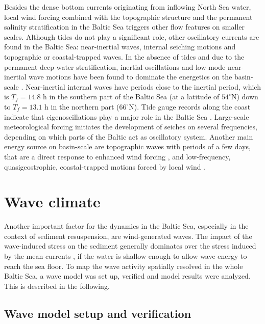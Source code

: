 Besides the dense bottom currents originating from inflowing North Sea water, 
local wind forcing combined with the topographic structure and the permanent 
salinity stratification in the Baltic Sea triggers other flow features on 
smaller scales. Although tides do not play a significant role, other 
oscillatory currents are found in the Baltic Sea: near-inertial waves, internal 
seiching motions and topographic or coastal-trapped waves.
In the absence of tides and due to the permanent deep-water stratification, 
inertial oscillations and low-mode near-inertial wave motions have been found to 
dominate the energetics on the basin-scale \citep[][]{vanderlee2011}. 
Near-inertial internal waves have periods close to the inertial period, which is 
$T_f = 14.8$ h in the southern part of the Baltic Sea (at a latitude of 
$54^{\circ}$N) down to $T_f = 13.1$ h in the northern part ($66^{\circ}$N). 
Tide gauge records along the coast indicate that eigenoscillations play a 
major role in the Baltic Sea \citep[][]{wubber1979}. Large-scale meteorological 
forcing initiates the development of seiches on several frequencies, depending 
on which parts of the Baltic act as oscillatory system. 
 Another main energy source on basin-scale are topographic waves with periods 
of a few days, that are a direct response to enhanced wind forcing 
\citep[][]{holtermann2012}, and low-frequency, quasigeostrophic, 
coastal-trapped motions forced by local wind \citep[][]{pizarro1998}.

\section{Wave climate}

Another important factor for the dynamics in the Baltic Sea, especially 
in the context of sediment resuspension, are wind-generated waves. The impact 
of the wave-induced stress on the sediment generally dominates over the stress 
induced by the mean currents \citep[][]{Grant1986}, if the water is shallow 
enough to allow wave energy to reach the sea floor. To map the wave activity 
spatially resolved in the whole Baltic Sea, a wave model was set up, verified 
and model results were analyzed. This is described in the following.

\subsection{Wave model setup and verification}

